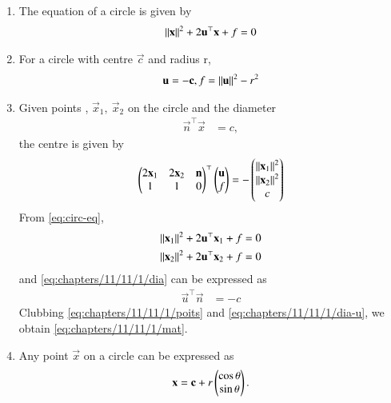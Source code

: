 \begin{enumerate}[label=\thesubsection.\arabic*.,ref=\thesubsection.\theenumi]
	\item The equation of a circle is given by 
	\label{prop:circ-eq}
\begin{align}
	\left\lVert\mathbf{x}\right\rVert^2 + 2 \mathbf{u}^{\top}\mathbf{x} + f = 0
	\label{eq:circ-eq}
\end{align}
\item For a circle with centre $\vec{c}$ and radius r,
\begin{align}
	\mathbf{u} = -\mathbf{c}, f = \left\lVert\mathbf{u}\right\rVert^2 - r^2
	\label{eq:circ-cr}
\end{align}
\item Given  points
\label{prop:chapters/11/11/1/pts},
	$\vec{x}_{1},\  \vec{x}_{2} $
on the circle and the diameter
\begin{align}
	\vec{n}^\top \vec{x} &= c,
	\label{eq:chapters/11/11/1/dia}
\end{align}
the centre is given by
\begin{align}
\begin{pmatrix}
 2 \mathbf{x}_1 & 2 \mathbf{x}_2 & \mathbf{n}
 \\
 1 & 1 & 0
 \end{pmatrix}^\top 
	\begin{pmatrix}\mathbf{u} \\ f\end{pmatrix}
	=
-\begin{pmatrix} 	\left\lVert\mathbf{x}_1\right\rVert^2 
\\
 	\left\lVert\mathbf{x}_2\right\rVert^2 	
	\\
	c     
	\end{pmatrix}
	\label{eq:chapters/11/11/1/mat}
                     \end{align}
\solution
	From 
	\eqref{eq:circ-eq},
\begin{align}
\begin{split}
	\left\lVert\mathbf{x}_1\right\rVert^2 + 2 \mathbf{u}^{\top}\mathbf{x}_1 + f = 0
	\\
	\left\lVert\mathbf{x}_2\right\rVert^2 + 2 \mathbf{u}^{\top}\mathbf{x}_2 + f = 0
\end{split}
	\label{eq:chapters/11/11/1/poits}
\end{align}
and 
	\eqref{eq:chapters/11/11/1/dia}
	can be expressed as
\begin{align}
	\vec{u}^\top \vec{n} &= -c
	\label{eq:chapters/11/11/1/dia-u}
\end{align}
Clubbing 
	\eqref{eq:chapters/11/11/1/poits}
	and 
	\eqref{eq:chapters/11/11/1/dia-u},
	we obtain 
	\eqref{eq:chapters/11/11/1/mat}.
\item Any point $\vec{x}$ on a circle can be expressed as
\begin{align}
\mathbf{x} = \mathbf{c} + r\begin{pmatrix}\cos \theta \\ \sin \theta\end{pmatrix}.
	\label{eq:circ-polar}
\end{align}

\end{enumerate}
